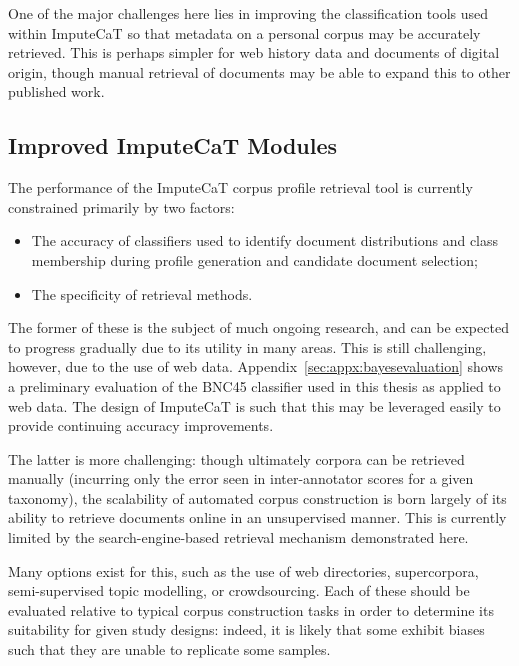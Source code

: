 One of the major challenges here lies in improving the classification tools used within ImputeCaT so that metadata on a personal corpus may be accurately retrieved.  This is perhaps simpler for web history data and documents of digital origin, though manual retrieval of documents may be able to expand this to other published work.





\subsection{Improved ImputeCaT Modules}
The performance of the ImputeCaT corpus profile retrieval tool is currently constrained primarily by two factors:

\begin{itemize}
    \item The accuracy of classifiers used to identify document distributions and class membership during profile generation and candidate document selection;
    \item The specificity of retrieval methods.
\end{itemize}

The former of these is the subject of much ongoing research, and can be expected to progress gradually due to its utility in many areas.  This is still challenging, however, due to the use of web data.  Appendix~\ref{sec:appx:bayesevaluation} shows a preliminary evaluation of the BNC45 classifier used in this thesis as applied to web data.  The design of ImputeCaT is such that this may be leveraged easily to provide continuing accuracy improvements.

The latter is more challenging: though ultimately corpora can be retrieved manually (incurring only the error seen in inter-annotator scores for a given taxonomy\cite{sharoffs2015}), the scalability of automated corpus construction is born largely of its ability to retrieve documents online in an unsupervised manner.  This is currently limited by the search-engine-based retrieval mechanism demonstrated here.

Many options exist for this, such as the use of web directories, supercorpora, semi-supervised topic modelling, or crowdsourcing.  Each of these should be evaluated relative to typical corpus construction tasks in order to determine its suitability for given study designs: indeed, it is likely that some exhibit biases such that they are unable to replicate some samples.


